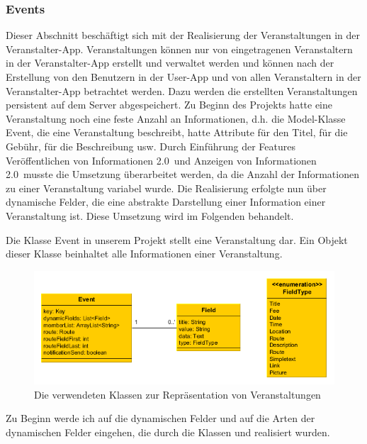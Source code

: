 \subsubsection{Events}
\label{sec:events}
Dieser Abschnitt beschäftigt sich mit der Realisierung der Veranstaltungen in der Veranstalter-App. Veranstaltungen können nur von eingetragenen Veranstaltern in der Veranstalter-App erstellt und verwaltet werden und können nach der Erstellung von den Benutzern in der User-App und von allen Veranstaltern in der Veranstalter-App betrachtet werden. Dazu werden die erstellten Veranstaltungen persistent auf dem Server abgespeichert. Zu Beginn des Projekts hatte eine Veranstaltung noch eine feste Anzahl an Informationen, d.h. die Model-Klasse \glqq Event\grqq, die eine Veranstaltung beschreibt, hatte Attribute für den Titel, für die Gebühr, für die Beschreibung usw. Durch Einführung der Features \glqq Veröffentlichen von Informationen 2.0\grqq\ und \glqq Anzeigen von Informationen 2.0\grqq\ musste die Umsetzung überarbeitet werden, da die Anzahl der Informationen zu einer Veranstaltung variabel wurde. Die Realisierung erfolgte nun über dynamische Felder, die eine abstrakte Darstellung einer Information einer Veranstaltung ist. Diese Umsetzung wird im Folgenden behandelt.

Die Klasse Event in unserem Projekt stellt eine Veranstaltung dar. Ein Objekt dieser Klasse beinhaltet alle Informationen einer Veranstaltung.

\begin{figure}[htb]
\centering
\includegraphics[width=\textwidth]{graphics/Model_Klassen.png}
\caption{Die verwendeten Klassen zur Repräsentation von Veranstaltungen}
\label{fig:modelEvents}
\end{figure}

Zu Beginn werde ich auf die dynamischen Felder und auf die Arten der dynamischen Felder eingehen, die durch die Klassen  und  realisiert wurden.\\

